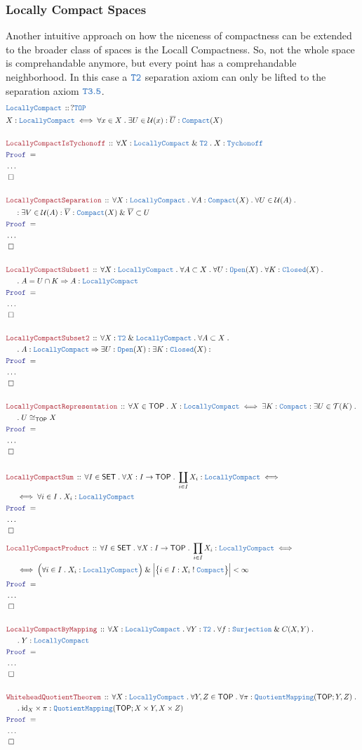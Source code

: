\documentclass[12pt]{scrartcl}
\newcommand{\TYPE}[1]{\textcolor{NavyBlue}{\mathtt{#1}}}
\newcommand{\LOGIC}[1]{\textcolor{Blue}{\mathtt{#1}}}
\newcommand{\THM}[1]{\textcolor{Maroon}{\mathtt{#1}}}
\renewcommand{\.}{\; . \;}
\newcommand{\IsNot}{\; ! \;}
\newcommand{\Theorem}[2]{& \THM{#1} \, :: \, #2 \\ & \Proof = \\ }
\newcommand{\DeclareType}[2]{& \TYPE{#1} \, :: \, #2 \\}
\newcommand{\DefineType}[3]{& #1 : \TYPE{#2} \iff #3 \\}
\newcommand{\NewLine}{\\ & \kern 1pc}
\newcommand{\Page}[1]{ \begin{align*} #1 \end{align*}   }
\newcommand{\NoProof}{ & \ldots \\ \EndProof}
\renewcommand{\And}{\; \& \;}
\newcommand{\Imply}{\Rightarrow}
\DeclareMathOperator*{\id}{id}
\newcommand{\QED}{\; \square}
\newcommand{\EndProof}{& \QED \\}
\newcommand{\Proof}{\LOGIC{Proof} \; }
\newcommand{\SET}{\mathsf{SET}}
\newcommand{\TOP}{\mathsf{TOP}}
\newcommand{\T}{\mathcal{T}}
\newcommand{\U}{\mathcal{U}}
\begin{document}
\subsubsection{Locally Compact Spaces}
Another intuitive approach on how the niceness of compactness can be extended to the broader class of
spaces is the Locall Compactness. So, not the whole space is comprehandable anymore, but every point has a comprehandable neighborhood. In this case a $\TYPE{T2}$ separation axiom can only be lifted to the separation axiom $\TYPE{T3.5}$. 
\Page{
	\DeclareType{LocallyCompact}{?\TYPE{TOP}}
	\DefineType{X}{LocallyCompact}{\forall x \in X \. \exists U \in \U(x) : \overline{U} : \TYPE{Compact}(X) }
	\\
	\Theorem{LocallyCompactIsTychonoff}{\forall X : \TYPE{LocallyCompact} \And \TYPE{T2} \. X : \TYPE{Tychonoff} }
	\NoProof
	\\
	\Theorem{LocallyCompactSeparation}
	{
		\forall X : \TYPE{LocallyCompact} \.
		\forall A : \TYPE{Compact}(X) \.
		\forall U \in \U(A) \. \NewLine : 
		\exists V \in \U(A) : 
		\overline{V} : \TYPE{Compact}(X) \And \overline{V} \subset U
	}
	\NoProof
	\\
	\Theorem{LocallyCompactSubset1}
	{
		\forall X : \TYPE{LocallyCompact} \.
		\forall A \subset X \.
		\forall U : \TYPE{Open}(X) \.
		\forall K : \TYPE{Closed}(X) \. \NewLine \. 
		A = U \cap K \Imply  A : \TYPE{LocallyCompact}
	}
	\NoProof
	\\
	\Theorem{LocallyCompactSubset2}
	{
		\forall X : \TYPE{T2} \And \TYPE{LocallyCompact} \.
		\forall A \subset X \. \NewLine \.
		A : \TYPE{LocallyCompact} \Imply \exists U : \TYPE{Open}(X) :
		\exists K : \TYPE{Closed}(X) :
	}
	\NoProof
	\\
	\Theorem{LocallyCompactRepresentation}
	{
		\forall X  \in \TOP \.
		X : \TYPE{LocallyCompact} \iff \exists K : \TYPE{Compact} : \exists U \in \T(K) \. 
		\NewLine \.
		U \cong_{\TOP} X
	}
	\NoProof
	\\
	\Theorem{LocallyCompactSum}
	{
		\forall I \in \SET \. \forall X : I \to \TOP \. 
		\coprod_{i\in I} X_i : \TYPE{LocallyCompact} \iff \NewLine \iff 
		\forall i \in I \. X_i : \TYPE{LocallyCompact}
	}
	\NoProof
}\Page{
	\Theorem{LocallyCompactProduct}
	{
		\forall I \in \SET \. \forall X : I \to \TOP \. 
		\prod_{i\in I} X_i : \TYPE{LocallyCompact} \iff \NewLine \iff 
		\Big(\forall i \in I \. X_i : \TYPE{LocallyCompact} \Big)
		\And  \Big|\big\{ i \in I : X_i \IsNot \TYPE{Compact}  \big\}\Big| < \infty
	}
	\NoProof
	\\
	\Theorem{LocallyCompactByMapping}
	{
		\forall X : \TYPE{LocallyCompact} \.
		\forall Y : \TYPE{T2} \.
		\forall f : \TYPE{Surjection} \And C(X,Y) \. \NewLine \.
		Y : \TYPE{LocallyCompact}
	}
	\NoProof
	\\
	\Theorem{WhiteheadQuotientTheorem}
	{
		\forall X : \TYPE{LocallyCompact} \.
		\forall Y,Z \in \TOP \.
		\forall \pi : \TYPE{QuotientMapping}(\TOP;Y,Z) \. \NewLine \. 
		{\id}_X \times \pi : \TYPE{QuotientMapping}(\TOP;X \times Y,X \times Z)
	}
	\NoProof
}
\newpage
\end{document}
